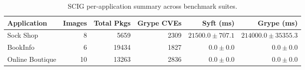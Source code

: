 \begin{table}[htbp]
\centering
\caption{SCIG per-application summary across benchmark suites.}
\label{tab:scig_s1_app_summary}
\begin{tabular}{lrrrrr}
\toprule
\textbf{Application} & \textbf{Images} & \textbf{Total Pkgs} & \textbf{Grype CVEs} & \textbf{Syft (ms)} & \textbf{Grype (ms)} \\
\midrule
Sock Shop & 8 & 5659 & 2309 & $21500.0 \pm 707.1$ & $214000.0 \pm 35355.3$ \\
BookInfo & 6 & 19434 & 1827 & $0.0 \pm 0.0$ & $0.0 \pm 0.0$ \\
Online Boutique & 10 & 13263 & 2836 & $0.0 \pm 0.0$ & $0.0 \pm 0.0$ \\
\bottomrule
\end{tabular}
\end{table}